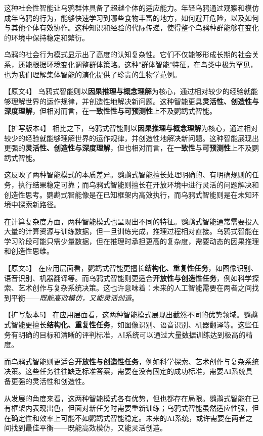 这种社会性智能让乌鸦群体具备了超越个体的适应能力。年轻乌鸦通过观察和模仿成年乌鸦的行为，能够快速学习到哪些食物丰富的地方，如何避开危险，以及如何与其他个体有效协作。这种知识和经验的代际传递，使得整个乌鸦种群能够在变化的环境中保持稳定和繁衍。

乌鸦的社会行为模式显示出了高度的认知复杂性。它们不仅能够形成长期的社会关系，还能根据环境变化调整群体策略。这种"群体智能"特征，在鸟类中极为罕见，也为我们理解集体智能的演化提供了珍贵的生物学范例。

【原文4】
乌鸦式智能则以\textbf{因果推理与概念理解}为核心，通过相对较少的经验就能够理解世界的运作规律，并创造性地解决新问题。这种智能更具\textbf{灵活性、创造性与深度理解}，但相对而言，在\textbf{一致性性与可预测性}上不及鹦鹉式智能。

【扩写版本4】
相比之下，乌鸦式智能则以\textbf{因果推理与概念理解}为核心，通过相对较少的经验就能够理解世界的运作规律，并创造性地解决新问题。这种智能展现出更强的\textbf{灵活性、创造性与深度理解}，但也相对而言，在\textbf{一致性}与\textbf{可预测性}上不及鹦鹉式智能。

这反映了两种智能模式的本质差异。鹦鹉式智能擅长处理明确的、有明确规则的任务，执行结果稳定可靠；而乌鸦式智能则擅长在开放环境中进行灵活的问题解决和创造性思考。鹦鹉式智能像是在已知框架内高效执行，而乌鸦式智能则是在未知环境中探索新路径。

在计算复杂度方面，两种智能模式也呈现出不同的特征。鹦鹉式智能通常需要投入大量的计算资源与训练数据，但一旦训练完成，推理过程相对直接。乌鸦式智能在学习阶段可能只需少量数据，但在推理时承担更高的复杂度，需要动态的因果推理和创造性思维。

【原文5】
在应用层面看，鹦鹉式智能更擅长\textbf{结构化、重复性任务}，如图像识别、语音识别、机器翻译等。而乌鸦式智能则更适合\textbf{开放性与创造性任务}，例如科学探索、艺术创作与复杂系统决策。这也许意味着：未来的人工智能需要在两者之间找到平衡——\emph{既能高效模仿，又能灵活创造}。

【扩写版本5】
在应用层面看，这两种智能模式展现出截然不同的优势领域。鹦鹉式智能更擅长\textbf{结构化、重复性任务}，如图像识别、语音识别、机器翻译等。这些任务有明确的目标和清晰的评判标准，AI系统可以通过大量数据训练达到极高的精度。

而乌鸦式智能则更适合\textbf{开放性与创造性任务}，例如科学探索、艺术创作与复杂系统决策。这些任务往往缺乏标准答案，需要在没有固定的成功标准，需要AI系统具备更强的灵活性和创造性。

从发展的角度来看，这两种智能模式各有优势，但也都存在局限。鹦鹉式智能在已有框架内表现出色，但面对新任务时需要重新训练；乌鸦式智能虽然适应性强，但在确定性和效率上可能不如鹦鹉式智能稳定。未来的AI系统，或许需要在两者之间找到最佳平衡——既能高效模仿，又能灵活创造。

